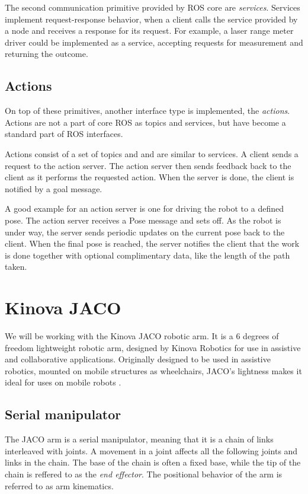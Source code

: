 \documentclass[buriama8_dp.tex]{subfiles}
\begin{document}
The second communication primitive provided by ROS core are \emph{services}. Services implement request-response behavior, when a client calls the service provided by a node and receives a response for its request. For example, a laser range meter driver could be implemented as a service, accepting requests for measurement and returning the outcome.

\subsection{Actions}
\label{subsec:ros_actions}

On top of these primitives, another interface type is implemented, the \emph{actions}. Actions are not a part of core ROS as topics and services, but have become a standard part of ROS interfaces.

Actions consist of a set of topics and and are similar to services. A client sends a request to the action server. The action server then sends feedback back to the client as it performs the requested action. When the server is done, the client is notified by a goal message.

A good example for an action server is one for driving the robot to a defined pose. The action server receives a Pose message and sets off. As the robot is under way, the server sends periodic updates on the current pose back to the client. When the final pose is reached, the server notifies the client that the work is done together with optional complimentary data, like the length of the path taken.


\section{Kinova JACO}
\label{sec:jaco}
We will be working with the Kinova JACO robotic arm. It is a 6 degrees of freedom lightweight robotic arm, designed by Kinova Robotics for use in assistive and collaborative applications. Originally designed to be used in assistive robotics, mounted on mobile structures as wheelchairs, JACO's lightness makes it ideal for uses on mobile robots \cite{kinova}.


\subsection{Serial manipulator}
\label{subsec:arm_theory}

The JACO arm is a serial manipulator, meaning that it is a chain of links interleaved with joints. A movement in a joint affects all the following joints and links in the chain. The base of the chain is often a fixed base, while the tip of the chain is reffered to as the \emph{end effector}. The positional behavior of the arm is referred to as arm kinematics.
\end{document}
